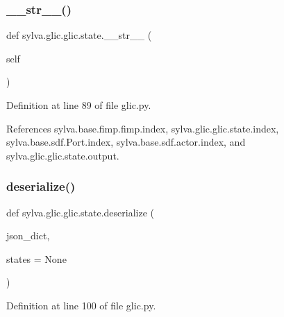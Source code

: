 \subsubsection{\texorpdfstring{\+\_\+\+\_\+str\+\_\+\+\_\+()}{\_\_str\_\_()}}
{\footnotesize\ttfamily def sylva.\+glic.\+glic.\+state.\+\_\+\+\_\+str\+\_\+\+\_\+ (\begin{DoxyParamCaption}\item[{}]{self }\end{DoxyParamCaption})}



Definition at line 89 of file glic.\+py.



References sylva.\+base.\+fimp.\+fimp.\+index, sylva.\+glic.\+glic.\+state.\+index, sylva.\+base.\+sdf.\+Port.\+index, sylva.\+base.\+sdf.\+actor.\+index, and sylva.\+glic.\+glic.\+state.\+output.


\mbox{\label{classsylva_1_1glic_1_1glic_1_1state_a00c5deb1533d0282be3a43587d483a2a}} 
\subsubsection{\texorpdfstring{deserialize()}{deserialize()}}
{\footnotesize\ttfamily def sylva.\+glic.\+glic.\+state.\+deserialize (\begin{DoxyParamCaption}\item[{}]{json\+\_\+dict,  }\item[{}]{states = {\ttfamily None} }\end{DoxyParamCaption})\hspace{0.3cm}{\ttfamily [static]}}



Definition at line 100 of file glic.\+py.


